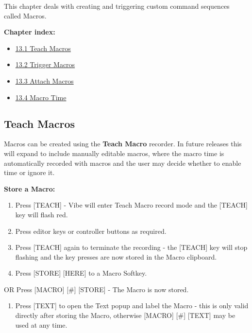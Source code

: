 \documentclass[
]{article}
\providecommand{\tightlist}{%
  \setlength{\itemsep}{0pt}\setlength{\parskip}{0pt}}
\begin{document}
This chapter deals with creating and triggering custom command sequences called Macros.

\textbf{Chapter index:}

\begin{itemize}
\tightlist
\item
  \protect\hyperlink{Teach-Macros-13.1}{13.1 Teach Macros}
\item
  \protect\hyperlink{Trigger-Macros-13.2}{13.2 Trigger Macros}
\item
  \protect\hyperlink{Attach-Macros-13.3}{13.3 Attach Macros}
\item
  \protect\hyperlink{Macro-Time-13.4}{13.4 Macro Time}
\end{itemize}

\hypertarget{Teach-Macros-13.1}{%
\subsection{Teach Macros}\label{Teach-Macros-13.1}}

Macros can be created using the \textbf{Teach Macro} recorder.
In future releases this will expand to include manually editable macros, where the macro time is automatically recorded with macros and the user may decide whether to enable time or ignore it.

\textbf{Store a Macro:}

\begin{enumerate}
\def\labelenumi{\arabic{enumi}.}
\item
  Press {[}TEACH{]} - Vibe will enter Teach Macro record mode and the {[}TEACH{]} key will flash red.
\item
  Press editor keys or controller buttons as required.
\item
  Press {[}TEACH{]} again to terminate the recording - the {[}TEACH{]} key will stop flashing and the key presses are now stored in the Macro clipboard.
\item
  Press {[}STORE{]} {[}HERE{]} to a Macro Softkey.
\end{enumerate}

OR Press {[}MACRO{]} {[}\#{]} {[}STORE{]} - The Macro is now stored.

\begin{enumerate}
\def\labelenumi{\arabic{enumi}.}
\setcounter{enumi}{4}
\tightlist
\item
  Press {[}TEXT{]} to open the Text popup and label the Macro - this is only valid directly after storing the Macro, otherwise {[}MACRO{]} {[}\#{]} {[}TEXT{]} may be used at any time.
\end{enumerate}
\end{document}
